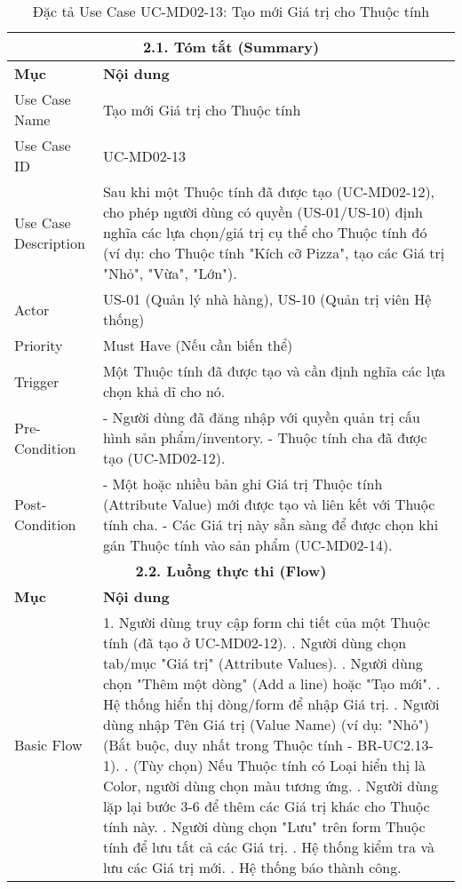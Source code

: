 \begin{longtable}{|m{4cm}|p{11cm}|}
\caption{Đặc tả Use Case UC-MD02-13: Tạo mới Giá trị cho Thuộc tính} \label{tab:uc_md02_13_revised} \\
\hline
\multicolumn{2}{|c|}{\textbf{2.1. Tóm tắt (Summary)}} \\
\hline
\textbf{Mục} & \textbf{Nội dung} \\
\hline
\endhead %
\hline
\endfoot %
\hline
\endlastfoot %
Use Case Name & Tạo mới Giá trị cho Thuộc tính \\
\hline
Use Case ID & UC-MD02-13 \\
\hline
Use Case Description & Sau khi một Thuộc tính đã được tạo (UC-MD02-12), cho phép người dùng có quyền (US-01/US-10) định nghĩa các lựa chọn/giá trị cụ thể cho Thuộc tính đó (ví dụ: cho Thuộc tính "Kích cỡ Pizza", tạo các Giá trị "Nhỏ", "Vừa", "Lớn"). \\
\hline
Actor & US-01 (Quản lý nhà hàng), US-10 (Quản trị viên Hệ thống) \\
\hline
Priority & Must Have (Nếu cần biến thể) \\
\hline
Trigger & Một Thuộc tính đã được tạo và cần định nghĩa các lựa chọn khả dĩ cho nó. \\
\hline
Pre-Condition & - Người dùng đã đăng nhập với quyền quản trị cấu hình sản phẩm/inventory. \newline - Thuộc tính cha đã được tạo (UC-MD02-12). \\
\hline
Post-Condition & - Một hoặc nhiều bản ghi Giá trị Thuộc tính (Attribute Value) mới được tạo và liên kết với Thuộc tính cha. \newline - Các Giá trị này sẵn sàng để được chọn khi gán Thuộc tính vào sản phẩm (UC-MD02-14). \\
\hline
\multicolumn{2}{|c|}{\textbf{2.2. Luồng thực thi (Flow)}} \\
\hline
\textbf{Mục} & \textbf{Nội dung} \\
\hline
Basic Flow & 1. Người dùng truy cập form chi tiết của một Thuộc tính (đã tạo ở UC-MD02-12). \newline 2. Người dùng chọn tab/mục "Giá trị" (Attribute Values). \newline 3. Người dùng chọn "Thêm một dòng" (Add a line) hoặc "Tạo mới". \newline 4. Hệ thống hiển thị dòng/form để nhập Giá trị. \newline 5. Người dùng nhập Tên Giá trị (Value Name) (ví dụ: "Nhỏ") (Bắt buộc, duy nhất trong Thuộc tính - BR-UC2.13-1). \newline 6. (Tùy chọn) Nếu Thuộc tính có Loại hiển thị là Color, người dùng chọn màu tương ứng. \newline 7. Người dùng lặp lại bước 3-6 để thêm các Giá trị khác cho Thuộc tính này. \newline 8. Người dùng chọn "Lưu" trên form Thuộc tính để lưu tất cả các Giá trị. \newline 9. Hệ thống kiểm tra và lưu các Giá trị mới. \newline 10. Hệ thống báo thành công. \\

\end{longtable}
